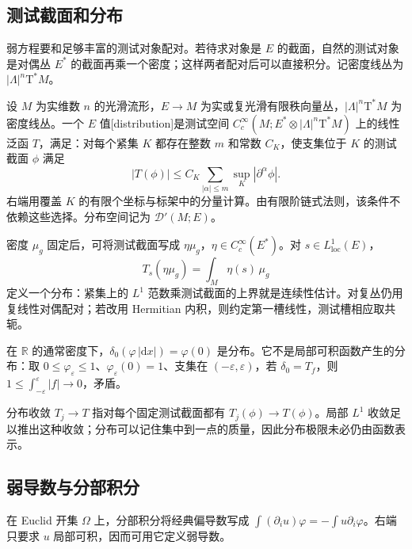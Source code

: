 \subsection{测试截面和分布}
\label{g3:subsec:1101:02}
弱方程要和足够丰富的测试对象配对。若待求对象是 \(E\) 的截面，自然的测试对象是对偶丛 \(E^*\) 的截面再乘一个密度；这样两者配对后可以直接积分。记密度线丛为 \(|\Lambda|^n\mathrm T^*M\)。

\begin{definition}\label{g3:def:bundle-distribution}
	设 \(M\) 为实维数 \(n\) 的光滑流形，\(E\to M\) 为实或复光滑有限秩向量丛，\(|\Lambda|^n\mathrm T^*M\) 为密度线丛。一个 \(E\) 值[distribution]是测试空间 \(C_c^\infty(M;E^*\otimes|\Lambda|^n\mathrm T^*M)\) 上的线性泛函 \(T\)，满足：对每个紧集 \(K\) 都存在整数 \(m\) 和常数 \(C_K\)，使支集位于 \(K\) 的测试截面 \(\phi\) 满足
	\[
		|T(\phi)|\le C_K\sum_{|\alpha|\le m}\sup_K|\partial^\alpha\phi|.
	\]
	右端用覆盖 \(K\) 的有限个坐标与标架中的分量计算。由有限阶链式法则，该条件不依赖这些选择。分布空间记为 \(\mathcal D'(M;E)\)。
\end{definition}

密度 \(\mu_g\) 固定后，可将测试截面写成 \(\eta\mu_g\)，\(\eta\in C_c^\infty(E^*)\)。对 \(s\in L^1_{\mathrm{loc}}(E)\)，
\[
	T_s(\eta\mu_g)=\int_M\eta(s)\,\mu_g
\]
定义一个分布：紧集上的 \(L^1\) 范数乘测试截面的上界就是连续性估计。对复丛仍用复线性对偶配对；若改用 Hermitian 内积，则约定第一槽线性，测试槽相应取共轭。

\begin{example}\label{g3:exm:point-distribution}
	在 \(\mathbb R\) 的通常密度下，\(\delta_0(\varphi\,|\mathrm dx|)=\varphi(0)\) 是分布。它不是局部可积函数产生的分布：取 \(0\le\varphi_\varepsilon\le1\)、\(\varphi_\varepsilon(0)=1\)、支集在 \((-\varepsilon,\varepsilon)\)，若 \(\delta_0=T_f\)，则 \(1\le\int_{-\varepsilon}^{\varepsilon}|f|\to0\)，矛盾。
\end{example}

分布收敛 \(T_j\to T\) 指对每个固定测试截面都有 \(T_j(\phi)\to T(\phi)\)。局部 \(L^1\) 收敛足以推出这种收敛；分布可以记住集中到一点的质量，因此分布极限未必仍由函数表示。

\subsection{弱导数与分部积分}
\label{g3:subsec:1101:03}
在 Euclid 开集 \(\Omega\) 上，分部积分将经典偏导数写成 \(\int (\partial_i u)\varphi=-\int u\partial_i\varphi\)。右端只要求 \(u\) 局部可积，因而可用它定义弱导数。

